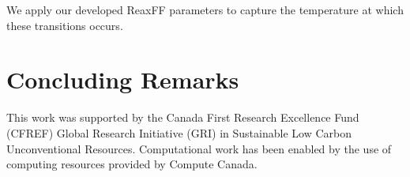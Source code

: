 \documentclass[journal=jpcafh,manuscript=article]{achemso}
\begin{document}
We apply our developed ReaxFF parameters to capture the temperature at which these transitions occurs.

\section{Concluding Remarks}
\label{sec:conclusions}


\begin{acknowledgement}
This work was supported by the Canada First Research Excellence Fund (CFREF) Global Research Initiative (GRI) in Sustainable Low Carbon Unconventional Resources.
Computational work has been enabled by the use of computing resources provided by Compute Canada.
\end{acknowledgement}

\pagebreak
\end{document}
